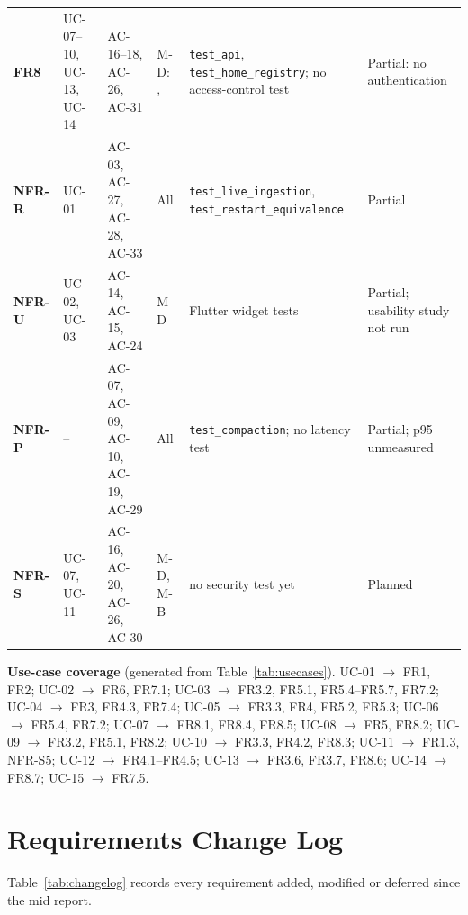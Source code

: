 \begin{ltab}
\begin{longtable}{@{}>{\bfseries}L{0.9cm}L{1.6cm}L{1.9cm}L{3.3cm}L{3.5cm}L{2.6cm}@{}}
FR8 & UC-07--10, UC-13, UC-14 & AC-16--18, AC-26, AC-31 & M-D: ,  & \texttt{test\_api}, \texttt{test\_home\_registry}; no access-control test & Partial: no authentication\\
NFR-R & UC-01 & AC-03, AC-27, AC-28, AC-33 & All & \texttt{test\_live\_ingestion}, \texttt{test\_restart\_equivalence} & Partial\\
NFR-U & UC-02, UC-03 & AC-14, AC-15, AC-24 & M-D & Flutter widget tests & Partial; usability study not run\\
NFR-P & -- & AC-07, AC-09, AC-10, AC-19, AC-29 & All & \texttt{test\_compaction}; no latency test & Partial; p95 unmeasured\\
NFR-S & UC-07, UC-11 & AC-16, AC-20, AC-26, AC-30 & M-D, M-B & no security test yet & Planned\\
\end{longtable}
\end{ltab}

\textbf{Use-case coverage} (generated from Table~\ref{tab:usecases}).
UC-01 $\rightarrow$ FR1, FR2; UC-02 $\rightarrow$ FR6, FR7.1; UC-03
$\rightarrow$ FR3.2, FR5.1, FR5.4--FR5.7, FR7.2; UC-04 $\rightarrow$ FR3,
FR4.3, FR7.4; UC-05 $\rightarrow$ FR3.3, FR4, FR5.2, FR5.3; UC-06
$\rightarrow$ FR5.4, FR7.2; UC-07 $\rightarrow$ FR8.1, FR8.4, FR8.5; UC-08
$\rightarrow$ FR5, FR8.2; UC-09 $\rightarrow$ FR3.2, FR5.1, FR8.2; UC-10
$\rightarrow$ FR3.3, FR4.2, FR8.3; UC-11 $\rightarrow$ FR1.3, NFR-S5; UC-12
$\rightarrow$ FR4.1--FR4.5; UC-13 $\rightarrow$ FR3.6, FR3.7, FR8.6; UC-14
$\rightarrow$ FR8.7; UC-15 $\rightarrow$ FR7.5.

\section{Requirements Change Log}
\label{sec:changelog}
Table~\ref{tab:changelog} records every requirement added, modified or deferred
since the mid report.

